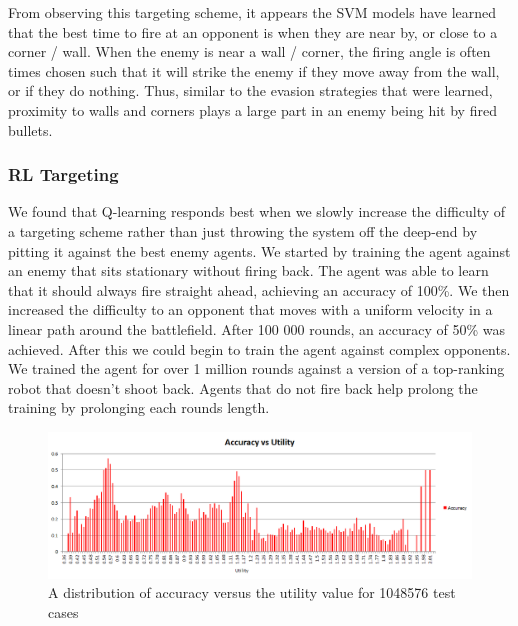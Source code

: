 \documentclass{article}
\theoremstyle{plain}
\theoremstyle{definition}
\theoremstyle{remark}
\begin{document}
From observing this targeting scheme, it appears the SVM models have learned that the best time to fire at an opponent is when they are near by, or close to a corner / wall. When the enemy is near a wall / corner, the firing angle is often times chosen such that it will strike the enemy if they move away from the wall, or if they do nothing. Thus, similar to the evasion strategies that were learned, proximity to walls and corners plays a large part in an enemy being hit by fired bullets. 

\subsubsection*{RL Targeting}
We found that Q-learning responds best when we slowly increase the difficulty of a targeting scheme rather than just throwing the system off the deep-end by pitting it against the best enemy agents. We started by training the agent against an enemy that sits stationary without firing back. The agent was able to learn that it should always fire straight ahead, achieving an accuracy of 100\%. We then increased the difficulty to an opponent that moves with a uniform velocity in a linear path around the battlefield. After 100 000 rounds, an accuracy of 50\% was achieved. After this we could begin to train the agent against complex opponents. We trained the agent for over 1 million rounds against a version of a top-ranking robot that doesn't shoot back. Agents that do not fire back help prolong the training by prolonging each rounds length.
\begin{figure}[h]
	\centering
		\includegraphics[width=15 cm]{Q_accu.png}
	\caption{A distribution of accuracy versus the utility value for 1048576 test cases}
	\label{q_accu}
\end{figure}
\end{document}
